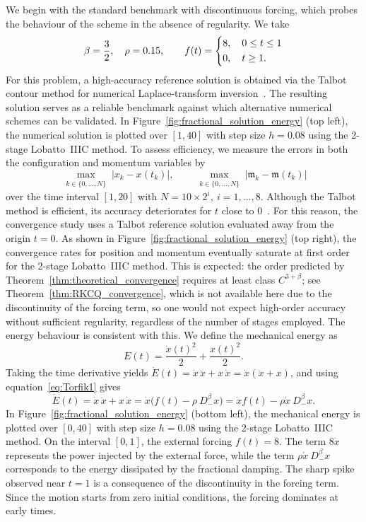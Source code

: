 \documentclass[a4paper,10pt,reqno]{amsart}
\theoremstyle{definition}
\newcommand{\m}{\mathfrak{m}}
\begin{document}
We begin with the standard benchmark with discontinuous forcing, which probes the behaviour of
the scheme in the absence of regularity. We take
$$\beta=\frac{3}{2},\quad\rho=0.15,\qquad f(t)=\begin{dcases}
8,\quad 0\leq t\leq 1\\
0,\quad t\geq 1.
\end{dcases}$$
For this problem, a high-accuracy reference solution is obtained via the Talbot contour method for numerical Laplace-transform inversion~\cite{talbot_79,weideman_2006}. The resulting solution serves as a reliable benchmark against which alternative numerical schemes can be validated. In Figure~\ref{fig:fractional_solution_energy} (top left), the numerical solution is plotted over $[1,40]$ with step size $h=0.08$ using the 2-stage  Lobatto~IIIC method. To assess efficiency, we measure the errors in both the configuration and momentum variables by
\begin{equation}\label{max_err}
    \max_{\substack{k\in\{0,\ldots,N\}}} \left|x_k - x(t_k)\right|,\qquad \max_{\substack{k\in\{0,\ldots,N\}}} \left|\m_k - \m(t_k)\right|
\end{equation}
over the time interval $[1,20]$ with  $N = 10\times 2^i,\  i =1,\ldots,8$. 
Although the Talbot method is efficient, its accuracy deteriorates for $t$ close to $0$~\cite{talbot_79}. For this reason, the convergence study uses a Talbot reference solution evaluated away from the origin $t=0$.
As shown in Figure~\ref{fig:fractional_solution_energy} (top right), the convergence rates for position and momentum eventually saturate at first order for the 2-stage Lobatto~IIIC method. This is expected: the order predicted by Theorem~\ref{thm:theoretical_convergence} requires at least  class $C^{3+\beta}$; see Theorem~\ref{thm:RKCQ_convergence}, which is not available here due to the discontinuity of the forcing term, so one would not expect high-order accuracy without sufficient regularity, regardless of the number of stages employed. The energy behaviour is consistent with this. We define the mechanical energy as
$$E(t)=\frac{\dot x(t)^2}{2}+\frac{ x(t)^2}{2}.$$
Taking the time derivative yields $\dot{E}(t) = \dot{x}\,\ddot{x} + x\,\dot{x} = \dot{x}(\ddot{x} + x)$, 
and using equation~\eqref{eq:Torfik1} gives
$$\dot{E}(t) = \dot{x}\,\ddot{x} + x\,\dot{x} = \dot{x}\big(f(t)-\rho\ D_{-}^{\beta} x\big)= \dot{x}f(t)-\rho\dot{x}\ D_{-}^{\beta} x.$$
In Figure~\ref{fig:fractional_solution_energy} (bottom left), the mechanical energy is plotted over $[0,40]$ with step size $h=0.08$ using the 2-stage  Lobatto~IIIC method.  On the interval $[0,1]$, the external forcing  $f(t)=8$.  The term $8\dot x$ represents the power injected by the external force, while the term $\rho\dot x \ D_{-}^{\beta}x$ corresponds to the energy dissipated by the fractional damping. The sharp spike observed near $t=1$ is a consequence of the discontinuity in the forcing term. Since the motion starts from zero initial conditions, the forcing dominates at early times. 
\end{document}
